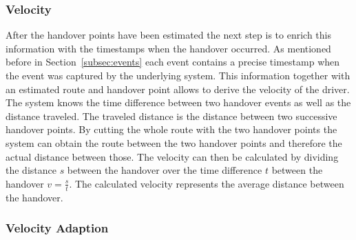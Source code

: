 \subsubsection{Velocity}
\label{sec:velocity}
After the handover points have been estimated the next step is to enrich this information with the timestamps when the handover occurred. As mentioned before in Section~\ref{subsec:events} each event contains a precise timestamp when the event was captured by the underlying system. This information together with an estimated route and handover point allows to derive the velocity of the driver. The system knows the time difference between two handover events as well as the distance traveled. The traveled distance is the distance between two successive handover points. By cutting the whole route with the two handover points the system can obtain the route between the two handover points and therefore the actual distance between those. The velocity can then be calculated  by dividing the distance $s$ between the handover over the time difference $t$ between the handover $v=\frac{s}{t}$. The calculated velocity represents the average distance between the handover.
\subsubsection{Velocity Adaption}
\label{sec:adaption}
